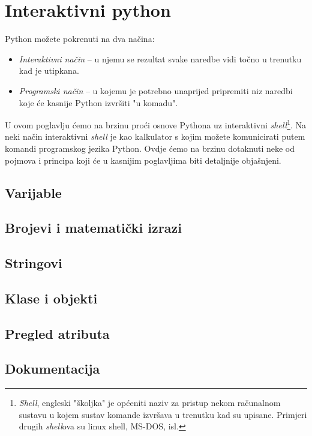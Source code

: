 \chapter{Interaktivni python}

Python možete pokrenuti na dva načina:

\begin{itemize}
	\item \emph{Interaktivni način} -- u njemu se rezultat svake naredbe vidi
		točno u trenutku kad je utipkana.
	\item \emph{Programski način} -- u kojemu je potrebno unaprijed pripremiti
		niz naredbi koje će kasnije Python izvršiti "u komadu".
\end{itemize}

U ovom poglavlju ćemo na brzinu proći osnove Pythona uz interaktivni
\emph{shell}\footnote{\emph{Shell}, engleski "školjka" je općeniti naziv za pristup
nekom računalnom sustavu u kojem sustav komande izvršava u trenutku kad su upisane.
Primjeri drugih \emph{shell}ova su linux shell, MS-DOS, isl.}. Na neki način
interaktivni \emph{shell} je kao kalkulator s kojim možete komunicirati putem komandi
programskog jezika Python. Ovdje ćemo na brzinu
dotaknuti neke od pojmova i principa koji će u kasnijim poglavljima biti detaljnije
objašnjeni.

\section{Varijable}

\section{Brojevi i matematički izrazi}

\section{Stringovi}

\section{Klase i objekti}

\section{Pregled atributa}

\section{Dokumentacija}
